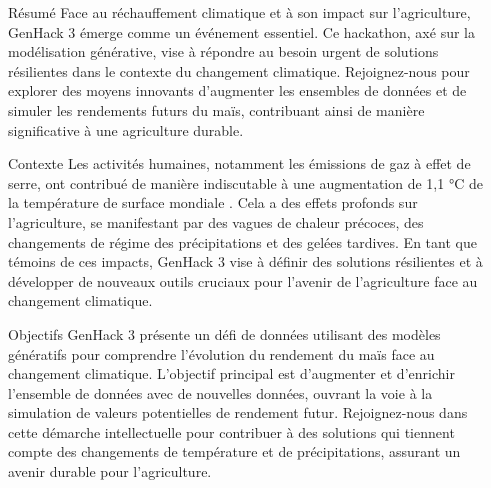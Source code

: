 \documentclass[final]{beamer}
\newlength{\sepwidth}
\newlength{\colwidth}
\newcommand{\separatorcolumn}{\begin{column}{\sepwidth}\end{column}}
\begin{document}
\begin{frame}[t]
\begin{columns}[t]
\separatorcolumn

\begin{column}{\colwidth}
    \begin{column}{\colwidth}
    \begin{block}{Résumé}
        Face au réchauffement climatique et à son impact sur l'agriculture, GenHack 3 émerge comme un événement essentiel. Ce hackathon, axé sur la modélisation générative, vise à répondre au besoin urgent de solutions résilientes dans le contexte du changement climatique. Rejoignez-nous pour explorer des moyens innovants d'augmenter les ensembles de données et de simuler les rendements futurs du maïs, contribuant ainsi de manière significative à une agriculture durable.
    \end{block}

    \begin{block}{Contexte}
        Les activités humaines, notamment les émissions de gaz à effet de serre, ont contribué de manière indiscutable à une augmentation de 1,1 °C de la température de surface mondiale \cite{Calvin2023}. Cela a des effets profonds sur l'agriculture, se manifestant par des vagues de chaleur précoces, des changements de régime des précipitations et des gelées tardives. En tant que témoins de ces impacts, GenHack 3 vise à définir des solutions résilientes et à développer de nouveaux outils cruciaux pour l'avenir de l'agriculture face au changement climatique.
    \end{block}

    \begin{block}{Objectifs}
        GenHack 3 présente un défi de données utilisant des modèles génératifs pour comprendre l'évolution du rendement du maïs face au changement climatique. L'objectif principal est d'augmenter et d'enrichir l'ensemble de données avec de nouvelles données, ouvrant la voie à la simulation de valeurs potentielles de rendement futur. Rejoignez-nous dans cette démarche intellectuelle pour contribuer à des solutions qui tiennent compte des changements de température et de précipitations, assurant un avenir durable pour l'agriculture.
    \end{block}


\end{column}
\end{column}
\end{columns}
\end{frame}
\end{document}
